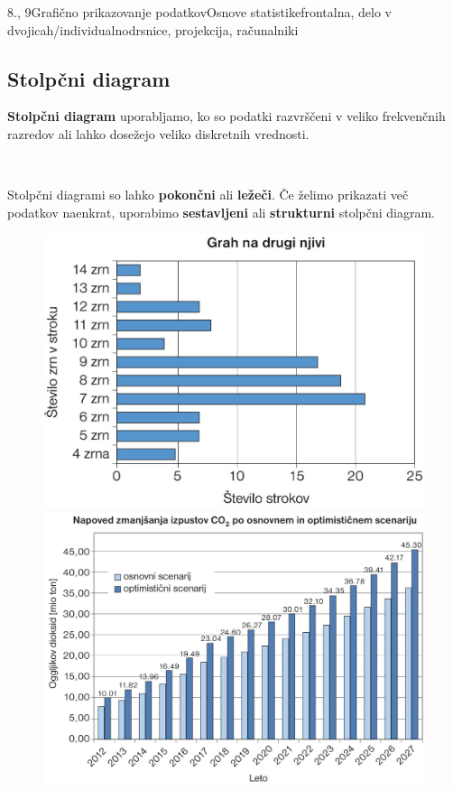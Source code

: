 \begin{priprava}{8., 9}{}{Grafično prikazovanje podatkov}{Osnove statistike}{frontalna, delo v dvojicah/individualno}{drsnice, projekcija, računalniki}
        ~

    \subsection*{Stolpčni diagram}

        \textbf{Stolpčni diagram} uporabljamo, ko so podatki razvrščeni v veliko frekvenčnih razredov
        ali lahko dosežejo veliko diskretnih vrednosti.
        
        ~
            
        Stolpčni diagrami so lahko \textbf{pokončni} ali \textbf{ležeči}. 
        Če želimo prikazati več podatkov naenkrat, uporabimo \textbf{sestavljeni} ali \textbf{strukturni} stolpčni diagram.
    
        
        \begin{figure}[H]
            \includegraphics[scale=0.3]{../../Slike_in_skice/1093.jpg}
            \includegraphics[scale=0.22]{../../Slike_in_skice/1095.jpg}

\end{figure}
\end{priprava}
